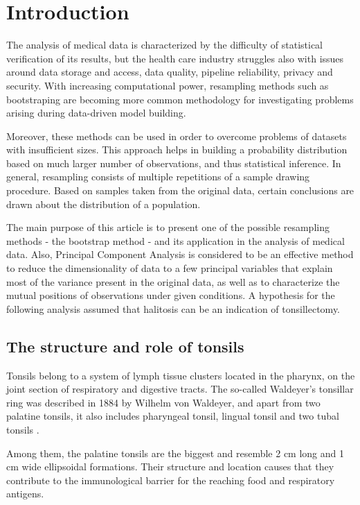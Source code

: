 \documentclass[12pt,a4paper,notitlepage]{report}
\begin{document}
\clearpage
\linespread{1.3}
\chapter{Introduction}

The analysis of medical data is characterized by the difficulty of statistical verification of its results, but the health care industry struggles also with issues around data storage and access, data quality, pipeline reliability, privacy and security. With increasing computational power, resampling methods such as bootstraping are becoming more common methodology for investigating problems arising during data-driven model building.

Moreover, these methods can be used in order to overcome problems of datasets with insufficient sizes. This approach helps in building a probability distribution based on much larger number of observations, and thus statistical inference. In general, resampling consists of multiple repetitions of a sample drawing procedure. Based on samples taken from the original data, certain conclusions are drawn about the distribution of a population\cite{Efron93}.

The main purpose of this article is to present one of the possible resampling methods - the bootstrap method - and its application in the analysis of medical data. Also, Principal Component Analysis is considered to be an effective method to reduce the dimensionality of data to a few principal variables that explain most of the variance present in the original data, as well as to characterize the mutual positions of observations under given conditions. A hypothesis for the following analysis assumed that halitosis can be an indication of tonsillectomy.


\section{The structure and role of tonsils}

Tonsils belong to a system of lymph tissue clusters located in the pharynx, on the joint section of respiratory and digestive tracts. The so-called Waldeyer's tonsillar ring was described in 1884 by Wilhelm von Waldeyer, and apart from two palatine tonsils, it also includes pharyngeal tonsil, lingual tonsil and two tubal tonsils \cite{Lapinska16}.

Among them, the palatine tonsils are the biggest and resemble 2 cm long and 1 cm wide ellipsoidal formations. Their structure and location causes that they contribute to the immunological barrier for the reaching food and respiratory antigens.
\end{document}
